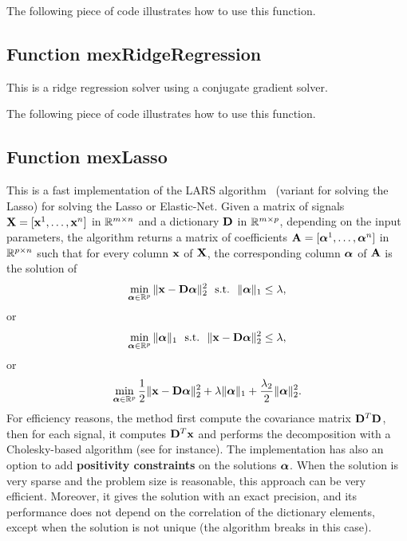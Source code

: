 \documentclass[a4paper, 11pt]{article}
\begin{document}
%    

The following piece of code illustrates how to use this function.



\subsection{Function mexRidgeRegression}
This is a ridge regression solver using a conjugate gradient solver.  

The following piece of code illustrates how to use this function.


\subsection{Function mexLasso}
This is a fast implementation of the LARS algorithm~\cite{efron} (variant for solving the Lasso) for solving the Lasso or Elastic-Net. Given a matrix of signals ${\mathbf X}=[{\mathbf x}^1,\ldots,{\mathbf x}^n]$  in ${\mathbb R}^{m \times n}$ and a dictionary ${\mathbf D}$ in ${\mathbb R}^{m \times p}$, depending on the input parameters, the algorithm returns a matrix of coefficients ${\mathbf A}=[{\boldsymbol\alpha}^1,\ldots,{\boldsymbol\alpha}^n]$ in ${\mathbb R}^{p \times n}$ such that for every column ${\mathbf x}$ of ${\mathbf X}$, the corresponding column ${\boldsymbol\alpha}$ of ${\mathbf A}$ is the solution of
\begin{equation}
\min_{{\boldsymbol\alpha} \in {\mathbb R}^p} \|{\mathbf x}-{\mathbf D}{\boldsymbol\alpha}\|_2^2 ~~\text{s.t.}~~ \|{\boldsymbol\alpha}\|_1 \leq \lambda,
   \end{equation}
   or 
   \begin{equation}
   \min_{{\boldsymbol\alpha} \in {\mathbb R}^p}  \|{\boldsymbol\alpha}\|_1 ~~\text{s.t.}~~ \|{\mathbf x}-{\mathbf D}{\boldsymbol\alpha}\|_2^2 \leq \lambda, \label{eq:lasso2}
   \end{equation}
   or
   \begin{equation}
   \min_{{\boldsymbol\alpha} \in {\mathbb R}^p} \frac{1}{2}\|{\mathbf x}-{\mathbf D}{\boldsymbol\alpha}\|_2^2 + \lambda \|{\boldsymbol\alpha}\|_1 + \frac{\lambda_2}{2}\|{\boldsymbol\alpha}\|_2^2. \label{eq:lasso}
   \end{equation}
   For efficiency reasons, the method first compute the covariance matrix ${\mathbf D}^T{\mathbf D}$, then
   for each signal, it computes ${\mathbf D}^T{\mathbf x}$ and performs the decomposition with a
   Cholesky-based algorithm (see \cite{efron} for instance).  The implementation
   has also an option to add {\bf positivity constraints} on the solutions
   ${\boldsymbol\alpha}$.  When the solution is very sparse and the problem size is
   reasonable, this approach can be very efficient. Moreover, it gives the
   solution with an exact precision, and its performance does not depend on the
   correlation of the dictionary elements, except when the solution is not unique
   (the algorithm breaks in this case).
\end{document}
